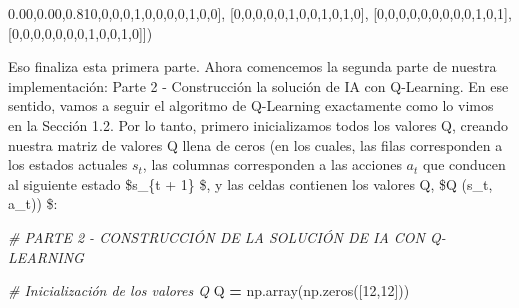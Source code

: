 \documentclass[
]{book}
\newenvironment{Shaded}{\begin{snugshade}}{\end{snugshade}}
\newcommand{\CommentTok}[1]{\textcolor[rgb]{0.56,0.35,0.01}{\textit{#1}}}
\newcommand{\DecValTok}[1]{\textcolor[rgb]{0.00,0.00,0.81}{#1}}
\newcommand{\NormalTok}[1]{#1}
\newcommand{\OperatorTok}[1]{\textcolor[rgb]{0.81,0.36,0.00}{\textbf{#1}}}
\begin{document}
\begin{Shaded}
\begin{Highlighting}[]
\NormalTok{              [}\DecValTok{0}\NormalTok{,}\DecValTok{0}\NormalTok{,}\DecValTok{0}\NormalTok{,}\DecValTok{0}\NormalTok{,}\DecValTok{1}\NormalTok{,}\DecValTok{0}\NormalTok{,}\DecValTok{0}\NormalTok{,}\DecValTok{0}\NormalTok{,}\DecValTok{0}\NormalTok{,}\DecValTok{1}\NormalTok{,}\DecValTok{0}\NormalTok{,}\DecValTok{0}\NormalTok{],}
\NormalTok{              [}\DecValTok{0}\NormalTok{,}\DecValTok{0}\NormalTok{,}\DecValTok{0}\NormalTok{,}\DecValTok{0}\NormalTok{,}\DecValTok{0}\NormalTok{,}\DecValTok{1}\NormalTok{,}\DecValTok{0}\NormalTok{,}\DecValTok{0}\NormalTok{,}\DecValTok{1}\NormalTok{,}\DecValTok{0}\NormalTok{,}\DecValTok{1}\NormalTok{,}\DecValTok{0}\NormalTok{],}
\NormalTok{              [}\DecValTok{0}\NormalTok{,}\DecValTok{0}\NormalTok{,}\DecValTok{0}\NormalTok{,}\DecValTok{0}\NormalTok{,}\DecValTok{0}\NormalTok{,}\DecValTok{0}\NormalTok{,}\DecValTok{0}\NormalTok{,}\DecValTok{0}\NormalTok{,}\DecValTok{0}\NormalTok{,}\DecValTok{1}\NormalTok{,}\DecValTok{0}\NormalTok{,}\DecValTok{1}\NormalTok{],}
\NormalTok{              [}\DecValTok{0}\NormalTok{,}\DecValTok{0}\NormalTok{,}\DecValTok{0}\NormalTok{,}\DecValTok{0}\NormalTok{,}\DecValTok{0}\NormalTok{,}\DecValTok{0}\NormalTok{,}\DecValTok{0}\NormalTok{,}\DecValTok{1}\NormalTok{,}\DecValTok{0}\NormalTok{,}\DecValTok{0}\NormalTok{,}\DecValTok{1}\NormalTok{,}\DecValTok{0}\NormalTok{]])}
\end{Highlighting}
\end{Shaded}

Eso finaliza esta primera parte. Ahora comencemos la segunda parte de nuestra implementación: Parte 2 - Construcción la solución de IA con Q-Learning. En ese sentido, vamos a seguir el algoritmo de Q-Learning exactamente como lo vimos en la Sección 1.2. Por lo tanto, primero inicializamos todos los valores Q, creando nuestra matriz de valores Q llena de ceros (en los cuales, las filas corresponden a los estados actuales \(s_t\), las columnas corresponden a las acciones \(a_t\) que conducen al siguiente estado \$s\_\{t + 1\} \$, y las celdas contienen los valores Q, \$Q (s\_t, a\_t)) \$:

\begin{Shaded}
\begin{Highlighting}[]
\CommentTok{\# PARTE 2 {-} CONSTRUCCIÓN DE LA SOLUCIÓN DE IA CON Q{-}LEARNING}

\CommentTok{\# Inicialización de los valores Q}
\NormalTok{Q }\OperatorTok{=}\NormalTok{ np.array(np.zeros([}\DecValTok{12}\NormalTok{,}\DecValTok{12}\NormalTok{]))}
\end{Highlighting}
\end{Shaded}
\end{document}
